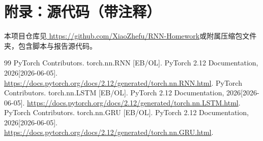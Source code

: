 \documentclass[12pt, oneside, a4paper]{ctexart}
\begin{document}
\section{附录：源代码（带注释）}
本项目仓库见\href{https://github.com/XiaoZhefu/RNN-Homework}{\color{blue} https://github.com/XiaoZhefu/RNN-Homework}或附属压缩包文件夹，包含脚本与报告源代码。
\par{}
\quad{}
\par{}
\begin{flushleft}
    \begin{small}
        \begin{thebibliography}{99}
             PyTorch Contributors. torch.nn.RNN [EB/OL]. PyTorch 2.12 Documentation, 2026[2026-06-05].
            \href{https://docs.pytorch.org/docs/2.12/generated/torch.nn.RNN.html}{\color{blue} https://docs.pytorch.org/docs/2.12/generated/torch.nn.RNN.html}.
            \vspace{-3mm}
             PyTorch Contributors. torch.nn.LSTM [EB/OL]. PyTorch 2.12 Documentation, 2026[2026-06-05].
            \href{https://docs.pytorch.org/docs/2.12/generated/torch.nn.LSTM.html}{\color{blue} https://docs.pytorch.org/docs/2.12/generated/torch.nn.LSTM.html}.
            \vspace{-3mm}
             PyTorch Contributors. torch.nn.GRU [EB/OL]. PyTorch 2.12 Documentation, 2026[2026-06-05].
            \href{https://docs.pytorch.org/docs/2.12/generated/torch.nn.GRU.html}{\color{blue} https://docs.pytorch.org/docs/2.12/generated/torch.nn.GRU.html}.
            \vspace{-3mm}
        \end{thebibliography}
    \end{small}
\end{flushleft}
\end{document}
